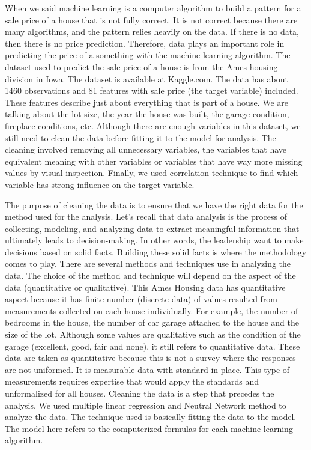 \documentclass[
]{article}
\begin{document}
When we said machine learning is a computer algorithm to build a pattern
for a sale price of a house that is not fully correct. It is not correct
because there are many algorithms, and the pattern relies heavily on the
data. If there is no data, then there is no price prediction. Therefore,
data plays an important role in predicting the price of a something with
the machine learning algorithm. The dataset used to predict the sale
price of a house is from the Ames housing division in Iowa. The dataset
is available at Kaggle.com. The data has about 1460 observations and 81
features with sale price (the target variable) included. These features
describe just about everything that is part of a house. We are talking
about the lot size, the year the house was built, the garage condition,
fireplace conditions, etc. Although there are enough variables in this
dataset, we still need to clean the data before fitting it to the model
for analysis. The cleaning involved removing all unnecessary variables,
the variables that have equivalent meaning with other variables or
variables that have way more missing values by visual inspection.
Finally, we used correlation technique to find which variable has strong
influence on the target variable.

The purpose of cleaning the data is to ensure that we have the right
data for the method used for the analysis. Let's recall that data
analysis is the process of collecting, modeling, and analyzing data to
extract meaningful information that ultimately leads to decision-making.
In other words, the leadership want to make decisions based on solid
facts. Building these solid facts is where the methodology comes to
play. There are several methods and techniques use in analyzing the
data. The choice of the method and technique will depend on the aspect
of the data (quantitative or qualitative). This Ames Housing data has
quantitative aspect because it has finite number (discrete data) of
values resulted from measurements collected on each house individually.
For example, the number of bedrooms in the house, the number of car
garage attached to the house and the size of the lot. Although some
values are qualitative such as the condition of the garage (excellent,
good, fair and none), it still refers to quantitative data. These data
are taken as quantitative because this is not a survey where the
responses are not uniformed. It is measurable data with standard in
place. This type of measurements requires expertise that would apply the
standards and unformalized for all houses. Cleaning the data is a step
that precedes the analysis. We used multiple linear regression and
Neutral Network method to analyze the data. The technique used is
basically fitting the data to the model. The model here refers to the
computerized formulas for each machine learning algorithm.
\end{document}
